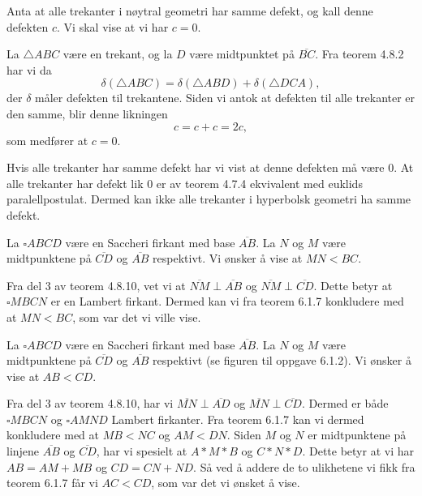 \begin{oppgave}[6.1.1]
    Anta at alle trekanter i nøytral geometri har samme defekt, og kall denne defekten $c$. 
    Vi skal vise at vi har $c=0$. 

    La $\triangle ABC$ være en trekant, og la $D$ være midtpunktet på $\overline{BC}$. 
    Fra teorem 4.8.2 har vi da
    $$\delta(\triangle ABC) = \delta(\triangle ABD)+\delta(\triangle DCA),$$
    der $\delta$ måler defekten til trekantene. 
    Siden vi antok at defekten til alle trekanter er den samme, blir denne likningen
    $$c=c+c=2c,$$
    som medfører at $c=0$. 

    Hvis alle trekanter har samme defekt har vi vist at denne defekten må være $0$. 
    At alle trekanter har defekt lik $0$ er av teorem 4.7.4 ekvivalent med euklids paralellpostulat. 
    Dermed kan ikke alle trekanter i hyperbolsk geometri ha samme defekt. 
\end{oppgave}

\begin{oppgave}[6.1.2]
    La $\square ABCD$ være en Saccheri firkant med base $\overline{AB}$. 
    La $N$ og $M$ være midtpunktene på $\overline{CD}$ og $\overline{AB}$ respektivt. 
    Vi ønsker å vise at $MN<BC$.

    \begin{figure}
        
    \end{figure}
    
    Fra del 3 av teorem 4.8.10, vet vi at $\overline{NM}\perp\overline{AB}$ og $\overline{NM}\perp\overline{CD}$. 
    Dette betyr at $\square MBCN$ er en Lambert firkant. 
    Dermed kan vi fra teorem 6.1.7 konkludere med at $MN<BC$, som var det vi ville vise. 
\end{oppgave}

\begin{oppgave}[6.1.3]
    La $\square ABCD$ være en Saccheri firkant med base $\overline{AB}$. 
    La $N$ og $M$ være midtpunktene på $\overline{CD}$ og $\overline{AB}$ respektivt (se figuren til oppgave 6.1.2).
    Vi ønsker å vise at $AB<CD$. 
    
    Fra del 3 av teorem 4.8.10, har vi $\overline{MN}\perp \overline{AD}$ og $\overline{MN}\perp\overline{CD}$.
    Dermed er både $\square MBCN$ og $\square AMND$ Lambert firkanter. 
    Fra teorem 6.1.7 kan vi dermed konkludere med at $MB<NC$ og $AM<DN$. 
    Siden $M$ og $N$ er midtpunktene på linjene $\overline{AB}$ og $\overline{CD}$, har vi spesielt at $A\ast M\ast B$ og $C\ast N\ast D$. 
    Dette betyr at vi har $AB=AM+MB$ og $CD=CN+ND$. 
    Så ved å addere de to ulikhetene vi fikk fra teorem 6.1.7 får vi $AC<CD$, som var det vi ønsket å vise. 
\end{oppgave}
